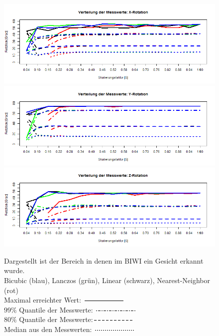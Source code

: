 \begin{figure}
	\centering
	\includegraphics[width=\linewidth]{img_Skalierung/Skal_Max_RX}
	\includegraphics[width=\linewidth]{img_Skalierung/Skal_Max_RY}
	\includegraphics[width=\linewidth]{img_Skalierung/Skal_Max_RZ}
	\caption{Dargestellt ist der Bereich in denen im BIWI \cite{database_Face_Ori} ein Gesicht erkannt wurde.\\
		Bicubic (blau), Lanczos (grün), Linear (schwarz), Nearest-Neighbor (rot)\\
		Maximal erreichter Wert: \protect\includegraphics[width=0.15\linewidth]{line/Line1}\\
		$99\%$ Quantile der Messwerte: \protect\includegraphics[width=0.15\linewidth]{line/Line4}\\
		$80\%$ Quantile der Messwerte:\protect\includegraphics[width=0.15\linewidth]{line/Line2}\\
		Median aus den Messwerten: \protect\includegraphics[width=0.15\linewidth]{line/Line3}}
	\label{img_Rot_Max}
\end{figure}
